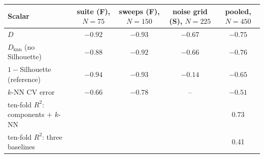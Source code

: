 \begin{tabular}{@{}lcccc@{}}
\toprule
Scalar & suite (F), $N=75$ & sweeps (F), $N=150$ & noise grid (S), $N=225$ & pooled, $N=450$ \\
\midrule
$D$ & $-0.92$ & $-0.93$ & $-0.67$ & $-0.75$ \\
$D_{\text{knn}}$ (no Silhouette) & $-0.88$ & $-0.92$ & $-0.66$ & $-0.76$ \\
$1-$Silhouette (reference) & $-0.94$ & $-0.93$ & $-0.14$ & $-0.65$ \\
$k$-NN CV error & $-0.66$ & $-0.78$ & -- & $-0.51$ \\
\midrule
ten-fold $R^2$: components $+$ $k$-NN & & & & 0.73 \\
ten-fold $R^2$: three baselines & & & & 0.41 \\
\bottomrule
\end{tabular}
